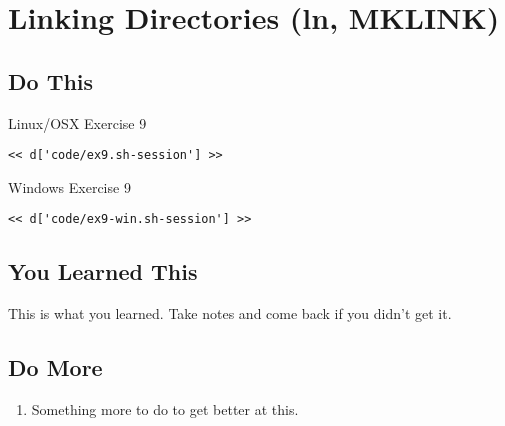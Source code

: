 \chapter{Linking Directories (ln, MKLINK)}

\section{Do This}

\begin{code}{Linux/OSX Exercise 9}
\begin{Verbatim}
<< d['code/ex9.sh-session'] >>
\end{Verbatim}
\end{code}

\begin{code}{Windows Exercise 9}
\begin{Verbatim}
<< d['code/ex9-win.sh-session'] >>
\end{Verbatim}
\end{code}

\section{You Learned This}

This is what you learned.  Take notes and come back if you didn't get it.

\section{Do More}

\begin{enumerate}
\item Something more to do to get better at this.
\end{enumerate}

